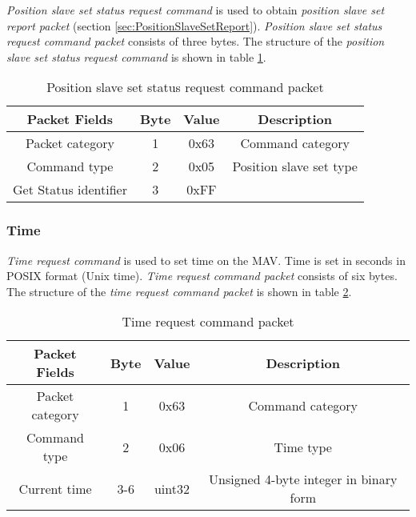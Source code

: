 \textit{Position slave set status request command} is used to obtain \textit{position slave set report packet} (section \ref{sec:PositionSlaveSetReport}). \textit{Position slave set status request command packet} consists of three bytes. The structure of the \textit{position slave set status request command} is shown in table \ref{tab:positionSlaveSetStatusRequestCommandPacket}.
\begin{table}[H]
\begin{center}
\begin{tabular}{c c c c}
\toprule
\rowcolor[HTML]{FFFC9E} 
\textbf{Packet Fields} & \textbf{Byte} & \textbf{Value}     & \textbf{Description}                     \\ \midrule
Packet category        & 1             & 0x63               & Command category                         \\ [1ex]
Command type           & 2             & 0x05               & Position slave set type                  \\ [1ex]
Get Status identifier  & 3             & 0xFF           &     \\ [1ex] \bottomrule
\end{tabular}
\end{center}
\caption{Position slave set status request command packet}
\label{tab:positionSlaveSetStatusRequestCommandPacket}
\end{table}

\subsubsection{Time}
\label{sec:TimeCommand}
\textit{Time request command} is used to set time on the MAV. Time is set in seconds in POSIX format (Unix time). 
\textit{Time request command packet} consists of six bytes. The structure of the \textit{time request command packet} is shown in table \ref{tab:timeRequestCommandPacket}.
\begin{table}[H]
\begin{center}
\begin{tabular}{c c c c}
\toprule
\rowcolor[HTML]{FFFC9E} 
\textbf{Packet Fields} & \textbf{Byte} & \textbf{Value} & \textbf{Description}           \\ \midrule
Packet category        & 1             & 0x63           & Command category               \\ [1ex]
Command type           & 2             & 0x06           & Time type                      \\ [1ex]
Current time           & 3-6           & uint32         & Unsigned 4-byte integer in binary form   \\ [1ex] \bottomrule
\end{tabular}
\end{center}
\caption{Time request command packet}
\label{tab:timeRequestCommandPacket}
\end{table}


